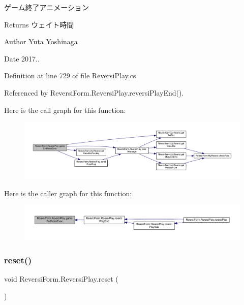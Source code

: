 ゲーム終了アニメーション 

\begin{DoxyReturn}{Returns}
ウェイト時間 
\end{DoxyReturn}
\begin{DoxyAuthor}{Author}
Yuta Yoshinaga 
\end{DoxyAuthor}
\begin{DoxyDate}{Date}
2017.. 
\end{DoxyDate}


Definition at line 729 of file Reversi\+Play.\+cs.



Referenced by Reversi\+Form.\+Reversi\+Play.\+reversi\+Play\+End().

Here is the call graph for this function\+:
\nopagebreak
\begin{figure}[H]
\begin{center}
\leavevmode
\includegraphics[width=350pt]{class_reversi_form_1_1_reversi_play_aec95b109a53b3cdab6466a4fca52f967_cgraph}
\end{center}
\end{figure}
Here is the caller graph for this function\+:
\nopagebreak
\begin{figure}[H]
\begin{center}
\leavevmode
\includegraphics[width=350pt]{class_reversi_form_1_1_reversi_play_aec95b109a53b3cdab6466a4fca52f967_icgraph}
\end{center}
\end{figure}
\mbox{\label{class_reversi_form_1_1_reversi_play_a03997d634aa21a84e660e7f98aa27064}} 
\subsubsection{\texorpdfstring{reset()}{reset()}}
{\footnotesize\ttfamily void Reversi\+Form.\+Reversi\+Play.\+reset (\begin{DoxyParamCaption}{ }\end{DoxyParamCaption})}



